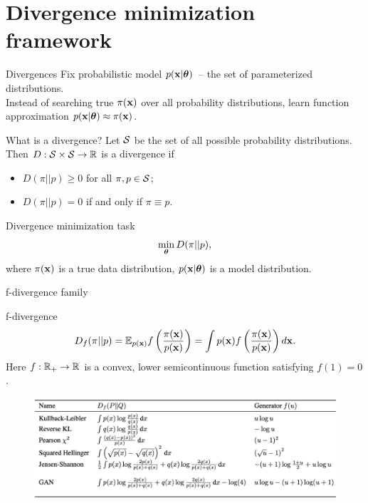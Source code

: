 \section{Divergence minimization framework}
\begin{frame}{Divergences}
	Fix probabilistic model $p(\mathbf{x} | \boldsymbol{\theta})$~-- the set of parameterized distributions. \\
	Instead of searching true $\pi(\mathbf{x})$ over all probability distributions, learn function approximation $p(\mathbf{x} | \boldsymbol{\theta}) \approx \pi(\mathbf{x})$.
	\begin{block}{What is a divergence?}
		Let $\mathcal{S}$ be the set of all possible probability distributions. Then $D: \mathcal{S} \times \mathcal{S} \rightarrow \mathbb{R}$ is a divergence if 
		\begin{itemize}
			\item $D(\pi || p) \geq 0$ for all $\pi, p \in \mathcal{S}$;
			\item $D(\pi || p) = 0$ if and only if $\pi \equiv p$.
		\end{itemize}
	\end{block}
	\begin{block}{Divergence minimization task}
		\vspace{-0.3cm}
		\[
		\min_{\boldsymbol{\theta}} D(\pi || p),
		\]
		where $\pi(\mathbf{x})$ is a true data distribution, $p(\mathbf{x} | \boldsymbol{\theta})$ is a model distribution.
	\end{block}
\end{frame}
\begin{frame}{f-divergence family}
	
	\begin{block}{f-divergence}
		\vspace{-0.3cm}
		\[
		D_f(\pi || p) = \mathbb{E}_{p(\mathbf{x})}  f\left( \frac{\pi(\mathbf{x})}{p(\mathbf{x})} \right)  = \int p(\mathbf{x}) f\left( \frac{\pi(\mathbf{x})}{p(\mathbf{x})} \right) d \mathbf{x}.
		\]
		Here $f: \mathbb{R}_+ \rightarrow \mathbb{R}$ is a convex, lower semicontinuous function satisfying $f(1) = 0$.
	\end{block}
	\begin{figure}
		\centering
		\includegraphics[width=\linewidth]{figs/f_divs}
	\end{figure}
\end{frame}
